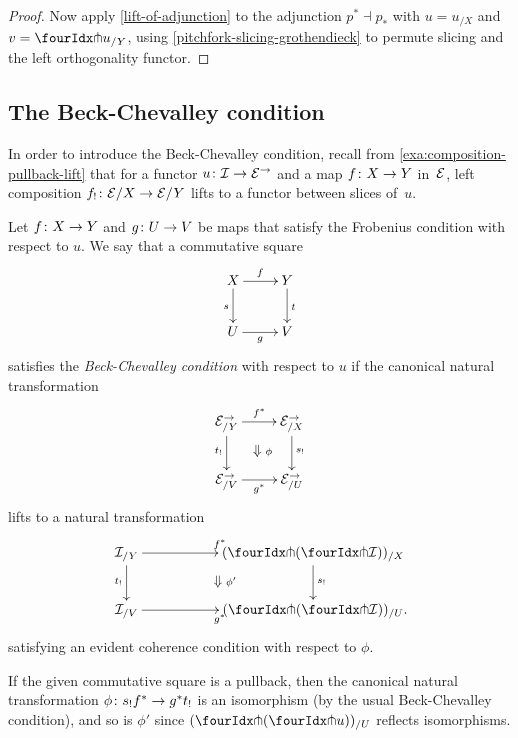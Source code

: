 \documentclass[reqno,10pt,a4paper,oneside,draft]{amsart}
\begin{document}
\begin{proof}
Now apply \cref{lift-of-adjunction} to the adjunction $p^* \dashv p_*$ with $u = u_{/X}$ and $v = {\liftr{u}}_{/Y}$, using \cref{pitchfork-slicing-grothendieck} to permute slicing and the left orthogonality functor.
\end{proof}

\subsection*{The Beck-Chevalley condition}

In order to introduce the Beck-Chevalley condition, recall from \cref{exa:composition-pullback-lift} that for a functor $u \colon \mathcal{I} \to \mathcal{E}^\to$ and a map $f \colon X \to Y$ in~$\mathcal{E}$, left composition $f_! \colon \mathcal{E}/X \to \mathcal{E}/Y$ lifts to a functor between slices of~$u$.

\begin{definition} \label{def:beck-chevalley}
Let $f \colon X \to Y$ and $g \colon U \to V$ be maps that satisfy the Frobenius condition with respect to $u$.
We say that a commutative square
\[
\xymatrix{
  X
  \ar[r]^{f}
  \ar[d]_{s}
&
  Y
  \ar[d]^{t}
\\
  U
  \ar[r]_{g}
&
  V
}
\]
satisfies the \emph{Beck-Chevalley condition} with respect to $u$ if the canonical natural transformation
\[
\xymatrix{
  \catE^\to_{/Y}
  \ar[d]_{t_!}
  \ar[r]^{f^*}
  \ar@{}[dr]|{\textstyle\Downarrow \rlap{$\labelstyle\phi$}}
&
  \catE^\to_{/X}
  \ar[d]^{s_!}
\\
  \catE^\to_{/V}
  \ar[r]_{g^*}
&
  \catE^\to_{/U}
}
\]
lifts to a natural transformation
\[
\xymatrix@C+3em{
  \cal{I}_{/Y}
  \ar[r]^{f^*}
  \ar[d]_{t_!}
  \ar@{}[dr]|{\textstyle\Downarrow \rlap{$\labelstyle\phi'$}}
&
  (\liftl{(\liftr{\cal{I}})})_{/X}
  \ar[d]^{s_!}
\\
  \cal{I}_{/V}
  \ar[r]_{g^*}
&
  (\liftl{(\liftr{\cal{I}})})_{/U}
\rlap{.}}
\]
satisfying an evident coherence condition with respect to $\phi$.
\end{definition}

\begin{remark} \label{beck-chevalley-iso}
If the given commutative square is a pullback, then the canonical natural transformation $\phi \colon s_! f^* \to g^* t_!$ is an isomorphism (by the usual Beck-Chevalley condition), and so is $\phi'$ since $(\liftl{(\liftr{u})})_{/U}$ reflects isomorphisms.
\end{remark}
\end{document}

